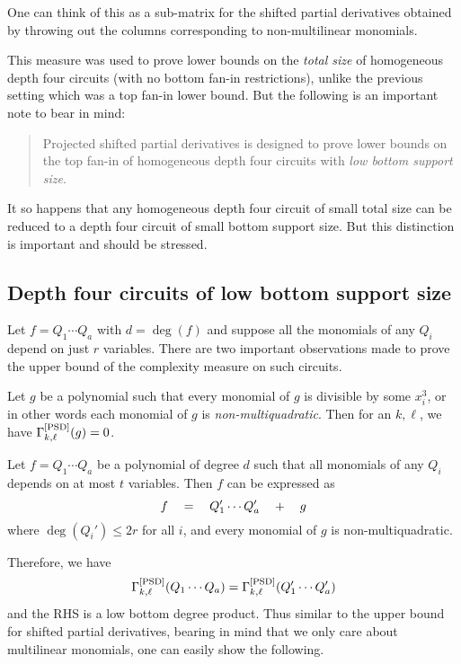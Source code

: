 One can think of this as a sub-matrix for the shifted partial derivatives obtained by throwing out the columns corresponding to non-multilinear monomials.

This measure was used to prove lower bounds on the \emph{total size} of homogeneous depth four circuits (with no bottom fan-in restrictions), unlike the previous setting which was a top fan-in lower bound. But the following is an important note to bear in mind:
\begin{quote}
Projected shifted partial derivatives is designed to prove lower bounds on the top fan-in of homogeneous depth four circuits with \emph{low bottom support size}. 
\end{quote}
It so happens that any homogeneous depth four circuit of small total size can be reduced to a depth four circuit of small bottom support size. But this distinction is important and should be stressed. 

\subsection{Depth four circuits of low bottom support size}

Let $f = Q_1 \cdots Q_a$ with $d = \deg(f)$ and suppose all the monomials of any $Q_i$ depend on just $r$ variables.
There are two important observations made to prove the upper bound of the complexity measure on such circuits.

\begin{observation*}
Let $g$ be a polynomial such that every monomial of $g$ is divisible by some $x_i^3$, or in other words each monomial of $g$ is \emph{non-multiquadratic}. Then for an $k,\ell$, we have $\Gamma^{\mathrm{[PSD]}}_{k,\ell}(g) = 0$. 
\end{observation*}

\begin{observation*}
Let $f = Q_1 \cdots Q_a$ be a polynomial of degree $d$ such that all monomials of any $Q_i$ depends on at most $t$ variables. Then $f$ can be expressed as
\[
f \quad = \quad Q_1'\cdots Q_a' \quad + \quad g
\]
where $\deg(Q_i') \leq 2r$ for all $i$, and every monomial of $g$ is non-multiquadratic.
\end{observation*}

Therefore, we have
\[
\Gamma^{\mathrm{[PSD]}}_{k,\ell}(Q_1\cdots Q_a) = \Gamma^{\mathrm{[PSD]}}_{k,\ell}(Q_1'\cdots Q_a')
\]
and the RHS is a low bottom degree product. Thus similar to the upper bound for shifted partial derivatives, bearing in mind that we only care about multilinear monomials, one can easily show the following.


